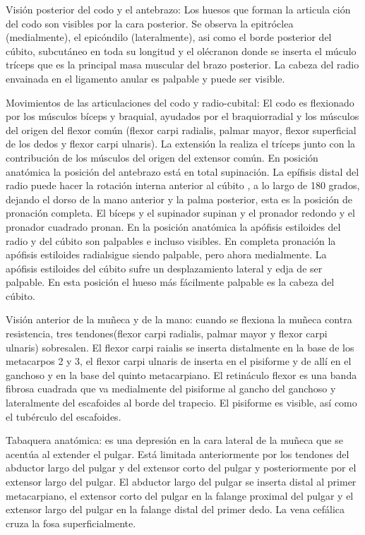Visión posterior del codo y el antebrazo: Los huesos que forman la articula ción del codo son visibles por la cara posterior. Se observa la epitróclea (medialmente), el epicóndilo (lateralmente), asi como el borde posterior del cúbito, subcutáneo en toda su longitud y el olécranon donde se inserta el múculo tríceps que es la principal masa muscular del brazo posterior. La cabeza del radio envainada en el ligamento anular es palpable y puede ser visible.

Movimientos de las articulaciones del codo y radio-cubital: El codo es flexionado por los músculos bíceps y braquial, ayudados por el braquiorradial y los músculos del origen del flexor común (flexor carpi radialis, palmar mayor, flexor superficial de los dedos y flexor carpi ulnaris). La extensión la realiza el tríceps junto con la contribución de los músculos del origen del extensor común.
En posición anatómica la posición del antebrazo está en total supinación. La epífisis distal del radio puede hacer la rotación interna anterior al cúbito , a lo largo de 180 grados, dejando el dorso de la mano anterior y la palma posterior, esta es la posición de pronación completa. El bíceps y el supinador supinan y el pronador redondo y el pronador cuadrado pronan.
En la posición anatómica la apófisis estiloides del radio y del cúbito son palpables e incluso visibles. En completa pronación la apófisis estiloides radialsigue siendo palpable, pero ahora medialmente. La apófisis estiloides del cúbito sufre un desplazamiento lateral y edja de ser palpable. En esta posición el hueso más fácilmente palpable es la cabeza del cúbito.

Visión anterior de la muñeca y de la mano: cuando se flexiona la muñeca contra resistencia, tres tendones(flexor carpi radialis, palmar mayor y flexor carpi ulnaris) sobresalen. El flexor carpi raialis se inserta distalmente en la base de los metacarpos 2 y 3, el flexor carpi ulnaris de inserta en el pisiforme y de allí en el ganchoso y en la base del quinto metacarpiano.
El retináculo flexor es una banda fibrosa cuadrada que va medialmente del pisiforme al gancho del ganchoso y lateralmente del escafoides al borde del trapecio. El pisiforme es visible, así como el tubérculo del escafoides.

Tabaquera anatómica: es una depresión en la cara lateral de la muñeca que se acentúa al extender el pulgar. Está limitada anteriormente por los tendones del abductor largo del pulgar y del extensor corto del pulgar y posteriormente por el extensor largo del pulgar. 
El abductor largo del pulgar se inserta distal al primer metacarpiano, el extensor corto del pulgar en la falange proximal del pulgar y el extensor largo del pulgar en la falange distal del primer dedo. La vena cefálica cruza la fosa superficialmente.

